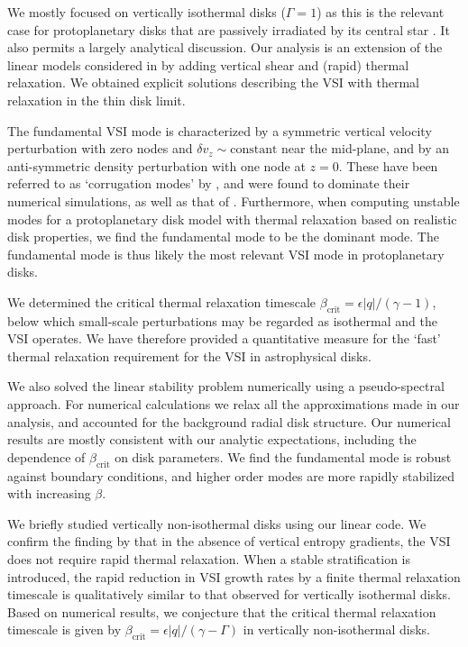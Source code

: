 We mostly focused on vertically isothermal disks ($\Gamma=1$) as 
this is the relevant case for protoplanetary disks that are passively irradiated by its central star 
\citep{chiang97}. It also permits a largely analytical discussion.
Our analysis is an extension of the linear models considered in
\cite{lubow93} by  adding vertical shear and (rapid) thermal
relaxation. We obtained explicit solutions describing the VSI with 
thermal relaxation in the thin disk limit. 

The fundamental VSI mode is characterized by a symmetric vertical
velocity perturbation with zero nodes and $\delta
v_z\sim\mathrm{constant}$ near the mid-plane, and by an anti-symmetric
density perturbation with one node at $z=0$.  These have been referred
to as `corrugation modes' by \cite{nelson13}, and were found to
dominate their numerical simulations, as well as that of
\cite{stoll14}. Furthermore, when computing unstable modes for a
protoplanetary disk model with thermal relaxation based on realistic
disk properties, we find the fundamental mode to be the dominant
mode. The fundamental mode is
thus likely the most relevant VSI mode in protoplanetary disks.  

We determined the critical thermal relaxation timescale 
$\beta_\mathrm{crit}=\epsilon|q|/(\gamma-1)$, below which small-scale
perturbations may be regarded as isothermal and the VSI 
operates. We have therefore provided a quantitative measure for the `fast'
thermal relaxation requirement for the VSI in astrophysical disks. 

We also solved the linear stability problem numerically using a
pseudo-spectral approach. For numerical calculations we relax all the
approximations made in our analysis, and accounted for
the background radial disk structure.  Our
numerical results are mostly consistent with our analytic 
expectations, including the dependence of $\beta_\mathrm{crit}$ on
disk parameters.  We find the fundamental mode is robust against
boundary conditions, and higher order modes are more rapidly
stabilized with increasing $\beta$. 

We briefly studied vertically non-isothermal disks using our linear 
code. We confirm the finding by \cite{nelson13} that in the absence
of vertical entropy gradients, the VSI does not require rapid thermal
relaxation.  When a stable stratification is introduced, the
rapid reduction in VSI growth rates by a finite thermal relaxation
timescale is qualitatively similar to that observed for vertically
isothermal disks. Based on numerical results, we conjecture that the
critical thermal relaxation timescale is given by 
$\beta_\mathrm{crit}=\epsilon|q|/(\gamma-\Gamma)$ in vertically 
non-isothermal disks.  


